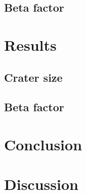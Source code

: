 \documentclass{article}
\begin{document}
		\subsection{Beta factor}

	\section{Results}
		\subsection{Crater size}
		\subsection{Beta factor}
	\section{Conclusion}
	\section{Discussion}
	
	\newpage 
	\printbibliography
 
\end{document}

